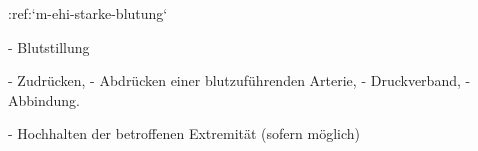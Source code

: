 %
:ref:`m-ehi-starke-blutung`
\begin{itemize}
  -   Blutstillung
  \begin{itemize}
    -   Zudrücken,
    -   Abdrücken einer blutzuführenden Arterie,
    -   Druckverband,
    -   Abbindung.
  \end{itemize}
  -   Hochhalten der betroffenen Extremität (sofern möglich)
\end{itemize}